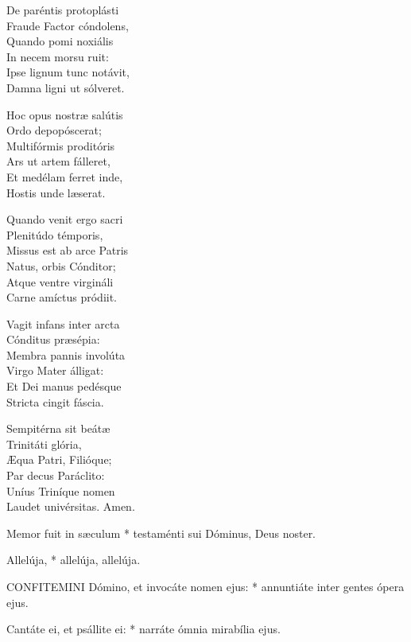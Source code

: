 De paréntis protoplásti\\
Fraude Factor cóndolens,\\
Quando pomi noxiális\\
In necem morsu ruit:\\
Ipse lignum tunc notávit,\\
Damna ligni ut sólveret.

Hoc opus nostræ salútis\\
Ordo depopóscerat;\\
Multifórmis proditóris\\
Ars ut artem fálleret,\\
Et medélam ferret inde,\\
Hostis unde læserat.

Quando venit ergo sacri\\
Plenitúdo témporis,\\
Missus est ab arce Patris\\
Natus, orbis Cónditor;\\
Atque ventre virgináli\\
Carne amíctus pródiit.

Vagit infans inter arcta\\
Cónditus præsépia:\\
Membra pannis involúta\\
Virgo Mater álligat:\\
Et Dei manus pedésque\\
Stricta cingit fáscia.

Sempitérna sit beátæ\\
Trinitáti glória,\\
Æqua Patri, Filióque;\\
Par decus Paráclito:\\
Uníus Triníque nomen\\
Laudet univérsitas. Amen.



 Memor fuit in sæculum * testaménti sui Dóminus, Deus noster.


 Allelúja, * allelúja, allelúja.


\lettrine[lines=2]{C}{ONFITEMINI} Dómino, et invocáte nomen ejus: * annuntiáte inter gentes ópera ejus.

Cantáte ei, et psállite ei: * narráte ómnia mirabília ejus.


